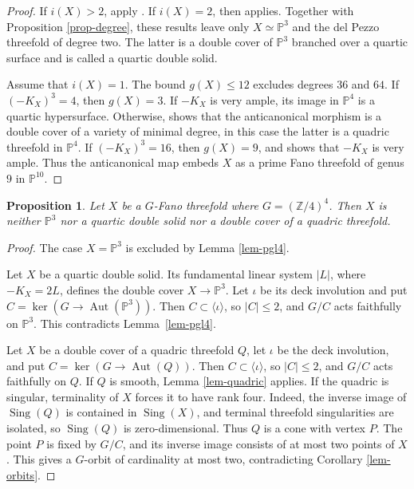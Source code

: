 \documentclass[10pt,oneside,reqno]{amsart}
\numberwithin{equation}{section}
\newtheorem{proposition}[theorem]{Proposition}
\theoremstyle{definition}
\newcommand{\Q}{\mathbb Q}
\newcommand{\PP}{\mathbb P}
\newcommand{\Aut}{\operatorname{Aut}}
\newcommand{\Sing}{\operatorname{Sing}}
\begin{document}
\begin{proof}
If $i(X)>2$, apply
\cite[Section~3.1]{ProkhorovGFanoI}. If $i(X)=2$, then
\cite[Theorem~3.2]{ProkhorovGFanoI} applies. Together with
Proposition \ref{prop-degree}, these results leave only
$X\simeq\PP^3$ and the del Pezzo threefold of degree two.  The latter
is a double cover of $\PP^3$ branched over a quartic surface and is
called a quartic double solid.

Assume that $i(X)=1$.  The bound $g(X)\leq12$ excludes degrees $36$
and $64$.  If $(-K_X)^3=4$, then $g(X)=3$.  If $-K_X$ is very ample,
its image in $\PP^4$ is a quartic hypersurface.  Otherwise,
\cite[Theorem~2.12]{PCS} shows that the anticanonical morphism is a
double cover of a variety of minimal degree, in this case the latter
is a quadric threefold in $\PP^4$.  If $(-K_X)^3=16$, then $g(X)=9$,
and \cite[Theorem~4.2]{ProkhorovRationalityI} shows that $-K_X$ is very
ample.  Thus the anticanonical map embeds $X$ as a prime Fano
threefold of genus $9$ in $\PP^{10}$.
\end{proof}

\begin{proposition}
\label{prop-hyperelliptic}
Let $X$ be a $G$-Fano threefold where $G=(\mathbb{Z}/4)^4$. 
Then $X$ is neither $\PP^3$ nor a quartic double solid nor a
double cover of a quadric threefold.
\end{proposition}

\begin{proof}
The case $X=\PP^3$ is excluded by Lemma \ref{lem-pgl4}.

Let $X$ be a quartic double solid.  Its fundamental linear system
$|L|$, where $-K_X=2L$, defines the double cover $X\to\PP^3$.  Let
$\iota$ be its deck involution and put
$C=\ker(G\to\Aut(\PP^3))$.  Then $C\subset\langle\iota\rangle$, so
$|C|\leq2$, and $G/C$ acts faithfully on $\PP^3$.  This contradicts
Lemma~\ref{lem-pgl4}.

Let $X$ be a double cover of a quadric threefold $Q$, let $\iota$ be
the deck involution, and put $C=\ker(G\to\Aut(Q))$.  Then
$C\subset\langle\iota\rangle$, so $|C|\leq2$, and $G/C$ acts
faithfully on $Q$. If $Q$ is smooth, Lemma
\ref{lem-quadric} applies.  If the quadric is singular, terminality of
$X$ forces it to have rank four.  Indeed, the inverse image of
$\Sing(Q)$ is contained in $\Sing(X)$, and terminal threefold
singularities are isolated, so $\Sing(Q)$ is zero-dimensional.  Thus $Q$
is a cone with vertex $P$.  The point $P$ is fixed by $G/C$, and its
inverse image consists of at most two points of $X$.  This gives a
$G$-orbit of cardinality at most two, contradicting Corollary
\ref{lem-orbits}.
\end{proof}
\end{document}
